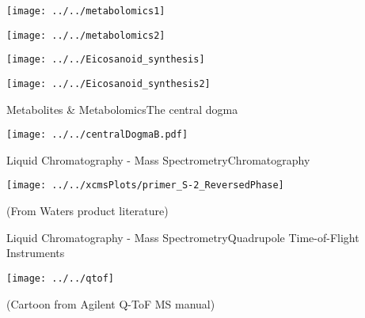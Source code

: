 \documentclass[xcolor=dvipsnames]{beamer}
\begin{document}
\begin{frame}
\begin{center}
	\texttt{[image: ../../metabolomics1]}
\end{center}
\addtocounter{framenumber}{-1}
\end{frame}

\begin{frame}
\begin{center}
	\texttt{[image: ../../metabolomics2]}
\end{center}
\addtocounter{framenumber}{-1}
\end{frame}

\begin{frame}
	\begin{center}
		\texttt{[image: ../../Eicosanoid\_synthesis]}
		
	\end{center}
\end{frame}

\begin{frame}
\begin{center}
	\texttt{[image: ../../Eicosanoid\_synthesis2]}
\end{center}
\addtocounter{framenumber}{-1}
\end{frame}

\begin{frame}{Metabolites \& Metabolomics}{The central dogma}
\vspace{-7 pt}
\begin{center}
	\texttt{[image: ../../centralDogmaB.pdf]}
\end{center}
\end{frame}

\begin{frame}{Liquid Chromatography - Mass Spectrometry}{Chromatography}
\begin{center}
	\texttt{[image: ../../xcmsPlots/primer\_S-2\_ReversedPhase]}
	
	\tiny{(From Waters product literature)}
\end{center}
\end{frame}

\begin{frame}{Liquid Chromatography - Mass Spectrometry}{Quadrupole Time-of-Flight Instruments}
\vspace{-7pt}
\begin{center}
	\texttt{[image: ../../qtof]}
	
	\tiny{(Cartoon from Agilent Q-ToF MS manual)}
\end{center}
\end{frame}
\end{document}
